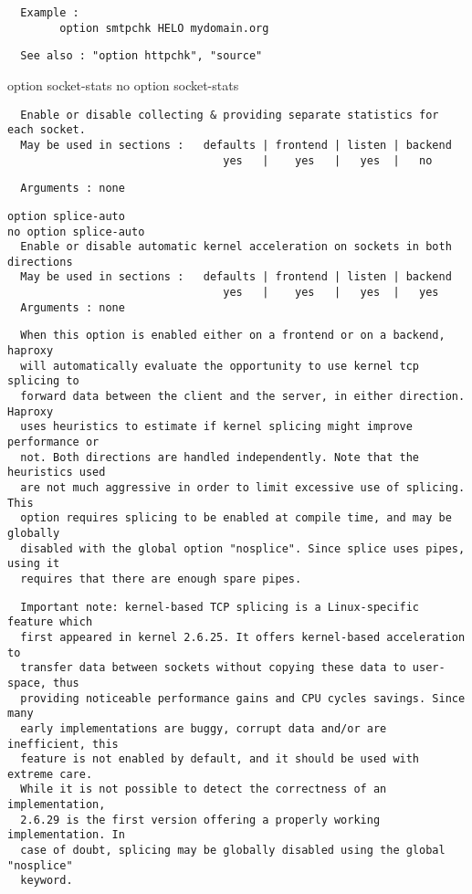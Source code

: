 \begin{verbatim}
  Example :
        option smtpchk HELO mydomain.org
\end{verbatim}

\begin{verbatim}
  See also : "option httpchk", "source"
\end{verbatim}


option socket-stats
no option socket-stats

\begin{verbatim}
  Enable or disable collecting & providing separate statistics for each socket.
  May be used in sections :   defaults | frontend | listen | backend
                                 yes   |    yes   |   yes  |   no
\end{verbatim}

\begin{verbatim}
  Arguments : none
\end{verbatim}

\begin{verbatim}
option splice-auto
no option splice-auto
  Enable or disable automatic kernel acceleration on sockets in both directions
  May be used in sections :   defaults | frontend | listen | backend
                                 yes   |    yes   |   yes  |   yes
  Arguments : none
\end{verbatim}

\begin{verbatim}
  When this option is enabled either on a frontend or on a backend, haproxy
  will automatically evaluate the opportunity to use kernel tcp splicing to
  forward data between the client and the server, in either direction. Haproxy
  uses heuristics to estimate if kernel splicing might improve performance or
  not. Both directions are handled independently. Note that the heuristics used
  are not much aggressive in order to limit excessive use of splicing. This
  option requires splicing to be enabled at compile time, and may be globally
  disabled with the global option "nosplice". Since splice uses pipes, using it
  requires that there are enough spare pipes.
\end{verbatim}

\begin{verbatim}
  Important note: kernel-based TCP splicing is a Linux-specific feature which
  first appeared in kernel 2.6.25. It offers kernel-based acceleration to
  transfer data between sockets without copying these data to user-space, thus
  providing noticeable performance gains and CPU cycles savings. Since many
  early implementations are buggy, corrupt data and/or are inefficient, this
  feature is not enabled by default, and it should be used with extreme care.
  While it is not possible to detect the correctness of an implementation,
  2.6.29 is the first version offering a properly working implementation. In
  case of doubt, splicing may be globally disabled using the global "nosplice"
  keyword.
\end{verbatim}

